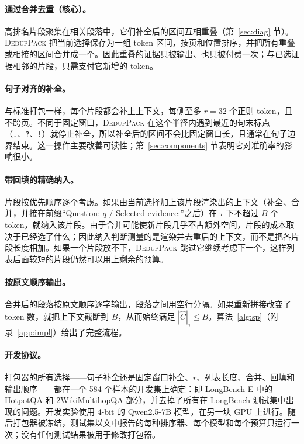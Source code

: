 \documentclass[11pt]{article}
\newcommand{\spk}{\textsc{DedupPack}}
\begin{document}
\paragraph{通过合并去重（核心）。}高排名片段聚集在相关段落中，它们补全后的区间互相重叠（第~\ref{sec:diag} 节）。\spk{} 把当前选择保存为一组 token 区间，按页和位置排序，并把所有重叠或相接的区间合并成一个。因此重叠的证据只被输出、也只被付费一次；与已选证据相邻的片段，只需支付它新增的 token。

\paragraph{句子对齐的补全。}与标准打包一样，每个片段都会补上上下文，每侧至多 $r=32$ 个正则 token，且不跨页。不同于固定窗口，\spk{} 在这个半径内遇到最近的句末标点（\texttt{.}、\texttt{?}、\texttt{!}）就停止补全，所以补全后的区间不会比固定窗口长，且通常在句子边界结束。这一操作主要改善可读性；第~\ref{sec:components} 节表明它对准确率的影响很小。

\paragraph{带回填的精确纳入。}片段按优先顺序逐个考虑。如果由当前选择加上该片段渲染出的上下文（补全、合并，并接在前缀“Question: $q$ / Selected evidence:”之后）在 $\tau$ 下不超过 $B$ 个 token，就纳入该片段。由于合并可能使新片段几乎不占额外空间，片段的成本取决于已经选了什么；因此纳入判断测量的是渲染并去重后的上下文，而不是把各片段长度相加。如果一个片段放不下，\spk{} 跳过它继续考虑下一个，这样列表后面较短的片段仍然可以用上剩余的预算。

\paragraph{按原文顺序输出。}合并后的段落按原文顺序逐字输出，段落之间用空行分隔。如果重新拼接改变了 token 数，就把上下文截断到 $B$，从而始终满足 $|\hat C|_\tau\le B$。算法~\ref{alg:sp}（附录~\ref{app:impl}）给出了完整流程。

\paragraph{开发协议。}
打包器的所有选择——句子补全还是固定窗口补全、$r$、列表长度、合并、回填和输出顺序——都在一个 584 个样本的开发集上确定：即 LongBench-E \citep{bai2023longbench} 中的 HotpotQA 和 2WikiMultihopQA 部分，并去掉了所有在 LongBench 测试集中出现的问题。开发实验使用 4-bit 的 Qwen2.5-7B 模型，在另一块 GPU 上进行。随后打包器被冻结，测试集以文中报告的每种排序器、每个模型和每个预算只运行一次；没有任何测试结果被用于修改打包器。
\end{document}
